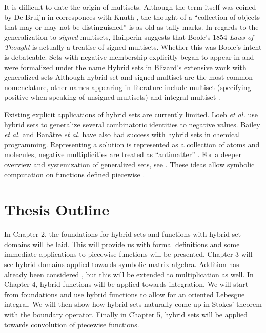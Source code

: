 It is difficult to date the origin of multisets.
Although the term itself was coined by De Bruijn in corresponces with Knuth \cite{knuth2014art},
the thought of a ``collection of objects that may or may not be distinguished'' is as old as tally marks. 
In regards to the generalization to \emph{signed} multisets, Hailperin \cite{hailperin1986boole} 
suggests that Boole's 1854 \emph{Laws of Thought} \cite{boole1854investigation} is actually a treatise of signed multisets.
Whether this was Boole's intent is debateable.
Sets with negative membership explicitly began to appear in \cite{whitney1933characteristic} and were 
formalized under the name Hybrid sets in Blizard's extensive work with generalized sets \cite{blizard1988, blizard1990} 
Although hybrid set and signed multiset are the most common nomenclature, other names appearing in literature include
multiset (specifying positive when speaking of unsigned multisets) \cite{reisig1985petri} 
and integral multiset \cite{wildberger2003new}. 


Existing explicit applications of hybrid sets are currently limited.
Loeb \emph{et al.} \cite{damiani1991, loeb1992} use hybrid sets to generalize several combinatoric identities to negative values.
Bailey \emph{et al.} \cite{bailey2009hypergraphic} and Ban\^{a}tre \emph{et al.} \cite{banatre2006} 
have also had success with hybrid sets in chemical programming. 
Representing a solution is represented as a collection of atoms and molecules, 
negative multiplicities are treated as ``antimatter'' . 
For a deeper overview and systemization of generalized sets, see \cite{singh2007, singh2008systematization}.
These ideas allow symbolic computation on functions defined piecewise \cite{carette2010}.


\section{Thesis Outline}


In Chapter 2, the foundations for hybrid sets and functions with hybrid set domains will be laid. 
This will provide us with formal definitions and some immediate applications to piecewise functions will be presented.
Chapter 3 will see hybrid domains applied towards symbolic matrix algebra.
Addition has already been considered \cite{carette2010}, but this will be extended to multiplication as well.
In Chapter 4, hybrid functions will be applied towards integration. 
We will start from foundations and use hybrid functions to allow for an oriented Lebesgue integral.
We will then show how hybrid sets naturally come up in Stokes' theorem with the boundary operator.
Finally in Chapter 5, hybrid sets will be applied towards convolution of piecewise functions.


















